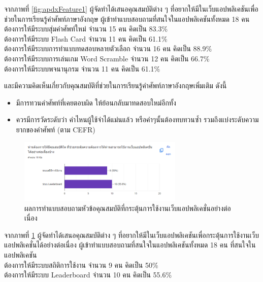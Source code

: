 \documentclass[12pt,oneside,openright,a4paper]{cpe-thai-project}
\begin{document}
\hspace{1cm}
จากภาพที่ \ref{fig:apdxFeature1} ผู้จัดทำได้เสนอคุณสมบัติต่าง ๆ ที่อยากให้มีในเว็บแอปพลิเคชันเพื่อช่วยในการเรียนรู้คำศัพท์ภาษาอังกฤษ
ผู้เข้าทำแบบสอบถามที่สนใจในแอปพลิเคชันทั้งหมด 18 คน
\\ต้องการให้มีระบบสุ่มคำศัพท์ใหม่ จำนวน 15 คน คิดเป็น 83.3\%
\\ต้องการให้มีระบบ Flash Card จำนวน 11 คน คิดเป็น 61.1\%
\\ต้องการให้มีระบบการทำแบบทดสอบหลายตัวเลือก จำนวน 16 คน คิดเป็น 88.9\%
\\ต้องการให้มีระบบการเล่นเกม Word Scramble จำนวน 12 คน คิดเป็น 66.7\%
\\ต้องการให้มีระบบพจนานุกรม จำนวน 11 คน คิดเป็น 61.1\%

และมีความคิดเห็นเกี่ยวกับคุณสมบัติที่ช่วยในการเรียนรู้คำศัพท์ภาษาอังกฤษเพิ่มเติม ดังนี้
\begin{itemize}
	\item มีการทวนคำศัพท์ที่เคยตอบผิด ให้ย้อนกลับมาทดสอบใหม่อีกทั้ง
	\item ควรมีการวัดระดับว่า คำไหนผู้ใช้จำได้แม่นแล้ว หรือคำๆนั้นต้องทบทวนซ้ำ รวมถึงแบ่งระดับความยากของคำศัพท์ (ตาม CEFR)
\end{itemize}

\pagebreak
{}
\begin{figure}[!h]\centering
	\includegraphics[width=0.7\textwidth, keepaspectratio=true]{image/appendix/1st/feature 2.png}
	\caption{{ผลการทำแบบสอบถามหัวข้อคุณสมบัติที่กระตุ้นการใช้งานเว็บแอปพลิเคชั่นอย่างต่อเนื่อง}}\label{fig:apdxFeature2}
\end{figure}

\hspace{1cm}
จากภาพที่ \ref{fig:apdxFeature2} ผู้จัดทำได้เสนอคุณสมบัติต่าง ๆ ที่อยากให้มีในเว็บแอปพลิเคชันเพื่อกระตุ้นการใช้งานเว็บแอปพลิเคชั่นได้อย่างต่อเนื่อง
ผู้เข้าทำแบบสอบถามที่สนใจในแอปพลิเคชันทั้งหมด 18 คน ที่สนใจในแอปพลิเคชัน
\\ต้องการให้มีระบบสถิติการใช้งาน จำนวน 9 คน คิดเป็น 50\%
\\ต้องการให้มีระบบ Leaderboard จำนวน 10 คน คิดเป็น 55.6\%
\end{document}
